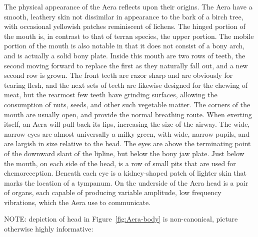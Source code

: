 The physical appearance of the Aera reflects upon their origins. The
Aera have a smooth, leathery skin not dissimilar in appearance to the
bark of a birch tree, with occasional yellowish patches reminiscent of
lichens. The hinged portion of the mouth is, in contrast to that of
terran species, the upper portion. The mobile portion of the mouth is
also notable in that it does not consist of a bony arch, and is
actually a solid bony plate. Inside this mouth are two rows of teeth,
the second moving forward to replace the first as they naturally fall
out, and a new second row is grown. The front teeth are razor sharp
and are obviously for tearing flesh, and the next sets of teeth are
likewise designed for the chewing of meat, but the rearmost few teeth
have grinding surfaces, allowing the consumption of nuts, seeds, and
other such vegetable matter. The corners of the mouth are usually
open, and provide the normal breathing route. When exerting itself, an
Aera will pull back its lips, increasing the size of the airway. The
wide, narrow eyes are almost universally a milky green, with wide,
narrow pupils, and are largish in size relative to the head. The eyes
are above the terminating point of the downward slant of the lipline,
but below the bony jaw plate. Just below the mouth, on each side of
the head, is a row of small pits that are used for
chemoreception. Beneath each eye is a kidney-shaped patch of lighter
skin that marks the location of a tympanum. On the underside of the
Aera head is a pair of organs, each capable of producing variable
amplitude, low frequency vibrations, which the Aera use to
communicate.

NOTE: depiction of head in Figure~\ref{fig:Aera-body} is non-canonical, picture otherwise highly informative:  


